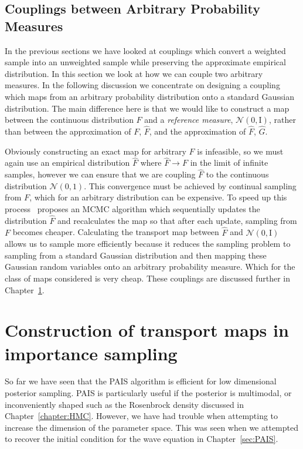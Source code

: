 \documentclass[final]{siamltex}
\begin{document}

\subsection{Couplings between Arbitrary Probability Measures}\label{sec:intro_TM}

In the previous sections we have looked at couplings which convert a weighted sample into an
unweighted sample while preserving the approximate empirical distribution. In this section we look at
how we can couple two arbitrary measures. In the following discussion we concentrate on designing a
coupling which maps from an arbitrary probability distribution onto a standard Gaussian
distribution. The main difference here is that we would like to construct a map between the
continuous distribution $F$ and a \emph{reference measure}, $\mathcal{N}(0, \text{I})$, rather than
between the approximation of $F$, $\hat{F}$, and the approximation of $\hat{F}$, $\hat{G}$.

Obviously constructing an exact map for arbitrary $F$ is infeasible, so we must again use an
empirical distribution $\hat{F}$ where $\hat{F}\rightarrow F$ in the limit of infinite samples,
however we can ensure that we are coupling $\hat{F}$ to the continuous distribution $\mathcal{N}(0,
1)$. This convergence must be achieved by continual sampling from $F$, which for an arbitrary
distribution can be expensive. To speed up this process~\cite{parno2014transport} proposes an MCMC
algorithm which sequentially updates the distribution $\hat{F}$ and recalculates the map so that
after each update, sampling from $F$ becomes cheaper. Calculating the transport map between
$\hat{F}$ and $\mathcal{N}(0, \text{I})$ allows us to sample more efficiently because it reduces the
sampling problem to sampling from a standard Gaussian distribution and then mapping these Gaussian
random variables onto an arbitrary probability measure. Which for the class of maps considered is
very cheap. These couplings are discussed further in Chapter~\ref{sec:map}.

\section{Construction of transport maps in importance sampling} \label{sec:map}

So far we have seen that the PAIS algorithm is efficient for low dimensional posterior sampling.
PAIS is particularly useful if the posterior is multimodal, or inconveniently shaped such as the
Rosenbrock density discussed in Chapter~\ref{chapter:HMC}. However, we have had trouble when
attempting to increase the dimension of the parameter space. This was seen when we attempted to
recover the initial condition for the wave equation in Chapter~\ref{sec:PAIS}.
\end{document}
